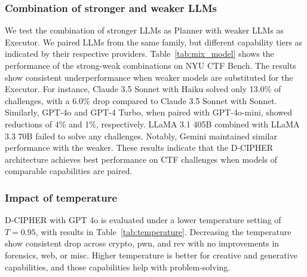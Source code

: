% 

\subsubsection{Combination of stronger and weaker LLMs}



We test the combination of stronger LLMs as Planner with weaker LLMs as Executor.
We paired LLMs from the same family, but different capability tiers as indicated by their respective providers.
Table~\ref{tab:mix_model} shows the performance of the strong-weak combinations on NYU CTF Bench. The results show consistent underperformance when weaker models are substituted for the Executor. For instance, Claude 3.5 Sonnet with Haiku solved only 13.0\% of challenges, with a 6.0\% drop compared to Claude 3.5 Sonnet with Sonnet. Similarly, GPT-4o and GPT-4 Turbo, when paired with GPT-4o-mini, showed reductions of 4\% and 1\%, respectively. LLaMA 3.1 405B combined with LLaMA 3.3 70B failed to solve any challenges. Notably, Gemini maintained similar performance with the weaker. These results indicate that the D-CIPHER architecture achieves best performance on CTF challenges when models of comparable capabilities are paired.

\subsubsection{Impact of temperature}
D-CIPHER with GPT 4o is evaluated under a lower temperature setting of $T=0.95$,  with results in Table~\ref{tab:temperature}. Decreasing the temperature show consistent drop across crypto, pwn, and rev with no improvements in forensics, web, or misc.
Higher temperature is better for creative and generative capabilities, and  those capabilities help with problem-solving.


